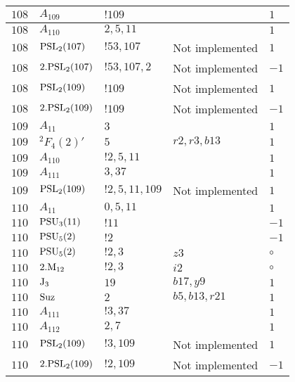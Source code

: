 \documentclass[a4paper, 11pt]{article}
\begin{document}
\begin{longtable}{lllll}
        $ 108 $ & $ A_{109} $ & $ !109 $ & $ ~ $ & $ 1$ \\ \hline
        $ 108 $ & $ A_{110} $ & $ 2, 5, 11 $ & $ ~ $ & $ 1$ \\ \hline
        $ 108 $ & $ {\rm PSL}_{2}(107) $ & $ !53, 107 $ &  Not implemented & $ 1$ \\ \hline
        $ 108 $ & $ 2.{\rm PSL}_{2}(107) $ & $ !53, 107, 2 $ &  Not implemented & $ -1$ \\ \hline
        $ 108 $ & $ {\rm PSL}_{2}(109) $ & $ !109 $ &  Not implemented & $ 1$ \\ \hline
        $ 108 $ & $ 2.{\rm PSL}_{2}(109) $ & $ !109 $ &  Not implemented & $ -1$ \\ \hline
        $ 109 $ & $ A_{11} $ & $ 3 $ & $ ~ $ & $ 1$ \\ \hline
        $ 109 $ & $ {}^{2}F_{4}(2)' $ & $ 5 $ & $ r2, r3, b13 $ & $ 1$ \\ \hline
        $ 109 $ & $ A_{110} $ & $ !2, 5, 11 $ & $ ~ $ & $ 1$ \\ \hline
        $ 109 $ & $ A_{111} $ & $ 3, 37 $ & $ ~ $ & $ 1$ \\ \hline
        $ 109 $ & $ {\rm PSL}_{2}(109) $ & $ !2, 5, 11, 109 $ &  Not implemented & $ 1$ \\ \hline
        $ 110 $ & $ A_{11} $ & $ 0,5,11 $ & $ ~ $ & $ 1$ \\ \hline
        $ 110 $ & $ {\rm PSU}_{3}(11) $ & $ ! 11 $ & $ ~ $ & $ -1$ \\ \hline
        $ 110 $ & $ {\rm PSU}_{5}(2) $ & $ ! 2 $ & $ ~ $ & $ -1$ \\ \hline
        $ 110 $ & $ {\rm PSU}_{5}(2) $ & $ ! 2,3 $ & $ z3 $ &  $\circ$ \\ \hline
        $ 110 $ & $ 2.{\rm M}_{12} $ & $ ! 2,3 $ & $ i2 $ &  $\circ$ \\ \hline
        $ 110 $ & $ {\rm J}_3 $ & $ 19 $ & $ b17, y9 $ & $ 1$ \\ \hline
        $ 110 $ & $ {\rm Suz} $ & $ 2 $ & $ b5, b13, r21 $ & $ 1$ \\ \hline
        $ 110 $ & $ A_{111} $ & $ !3, 37 $ & $ ~ $ & $ 1$ \\ \hline
        $ 110 $ & $ A_{112} $ & $ 2, 7 $ & $ ~ $ & $ 1$ \\ \hline
        $ 110 $ & $ {\rm PSL}_{2}(109) $ & $ !3, 109 $ &  Not implemented & $ 1$ \\ \hline
        $ 110 $ & $ 2.{\rm PSL}_{2}(109) $ & $ !2, 109 $ &  Not implemented & $ -1$ \\ \hline

\end{longtable}
\end{document}
